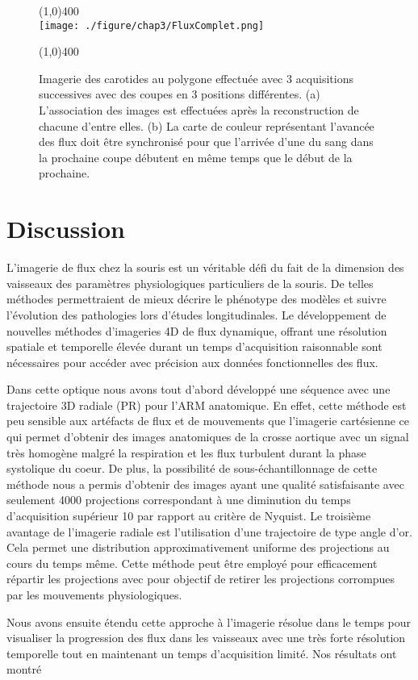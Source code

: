 \begin{figure}[H]
\centering \line(1,0){400} \\
\texttt{[image: ./figure/chap3/FluxComplet.png]}
\caption[Image d'ARM dynamique sur souris des carotides au polygone de Willis]{\label{fig:FluxComplet} Imagerie des carotides au polygone effectuée avec 3 acquisitions successives avec des coupes en 3 positions différentes. (a) L'association des images est effectuées après la reconstruction de chacune d'entre elles. (b) La carte de couleur représentant l'avancée des flux doit être synchronisé pour que l'arrivée d'une du sang dans la prochaine coupe débutent en même temps que le début de la prochaine.}
\line(1,0){400} \\ \end{figure}

\section{Discussion}

L'imagerie de flux chez la souris est un véritable défi du fait de la dimension des vaisseaux des paramètres physiologiques particuliers de la souris. De telles méthodes permettraient de mieux décrire le phénotype des modèles et suivre l'évolution des pathologies lors d'études longitudinales. Le développement de nouvelles méthodes d'imageries 4D de flux dynamique, offrant une résolution spatiale et temporelle élevée durant un temps d'acquisition raisonnable sont nécessaires pour accéder avec précision aux données fonctionnelles des flux.

Dans cette optique nous avons tout d'abord développé une séquence avec une trajectoire 3D radiale (PR) pour l'ARM anatomique. En effet, cette méthode est peu sensible aux artéfacts de flux et de mouvements que l'imagerie cartésienne ce qui permet d'obtenir des images anatomiques de la crosse aortique avec un signal très homogène malgré la respiration et les flux turbulent durant la phase systolique du coeur. De plus, la possibilité de sous-échantillonnage de cette méthode nous a permis d'obtenir des images ayant une qualité satisfaisante avec seulement 4000 projections correspondant à une diminution du temps d'acquisition supérieur 10 par rapport au critère de Nyquist. Le troisième avantage de l'imagerie radiale est l'utilisation d'une trajectoire de type angle d'or. Cela permet une distribution approximativement uniforme des projections au cours du temps même. Cette méthode peut être employé pour efficacement répartir les projections avec pour objectif de retirer les projections corrompues par les mouvements physiologiques.

Nous avons ensuite étendu cette approche à l'imagerie résolue dans le temps pour visualiser la progression des flux dans les vaisseaux avec une très forte résolution temporelle tout en maintenant un temps d'acquisition limité. Nos résultats ont montré

%
